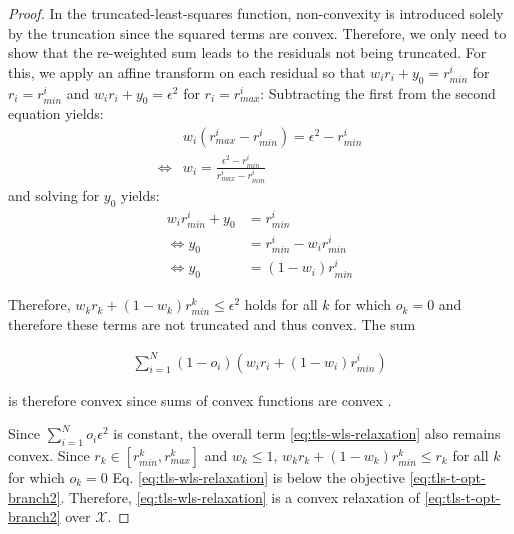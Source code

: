 \begin{proof}
	
	In the truncated-least-squares function, non-convexity is introduced solely by the truncation since the squared terms are convex.
	Therefore, we only need to show that the re-weighted sum leads to the residuals not being truncated. 
	For this, we apply an affine transform on each residual so that $w_i r_i + y_0 = r_{min}^i$ for $r_i = r_{min}^i$ and $w_i r_i + y_0 = \epsilon^2$ for $r_i = r_{max}^i$:
	Subtracting the first from the second equation yields:
	\begin{equation}
		\begin{aligned}	
			&w_i (r_{max}^i - r_{min}^i) = \epsilon^2 - r_{min}^i\\
			\iff &w_i  = \frac{\epsilon^2 - r_{min}^i}{r_{max}^i - r_{min}^i}
		\end{aligned}
	\end{equation}
	and solving for $y_0$ yields:
	\begin{equation}
		\begin{aligned}	
			w_i r_{min}^i + y_0 &= r_{min}^i\\
			\iff y_0 &= r_{min}^i - w_i r_{min}^i\\
			\iff y_0 &= (1- w_i) r_{min}^i
		\end{aligned}
	\end{equation}
	
	Therefore, $w_k r_k + (1 - w_k) r_{min}^k \leq \epsilon^2$ holds for all $k$ for which $o_k = 0$ and therefore these terms are not truncated and thus convex. The sum
	
	\begin{equation}
		\begin{aligned}	
			\sum_{i=1}^{N} (1 - o_i) \left(w_i r_i  + (1 - w_i) r_{min}^i \right)
		\end{aligned}
	\end{equation}
	
	is therefore convex since sums of convex functions are convex \cite[Ch. 2.3.2, p.36]{Boyd_Vandenberghe_2004}.
	
	Since $\sum_{i=1}^{N} o_i\epsilon^2$ is constant, the overall term \ref{eq:tls-wls-relaxation} also remains convex. Since $r_k \in [r^k_{min}, r^k_{max}]$ and $w_k \leq 1$, $w_k r_k  + (1 - w_k) r_{min}^k \leq r_k$ for all $k$ for which $o_k = 0$  Eq. \ref{eq:tls-wls-relaxation} is below the objective \ref{eq:tls-t-opt-branch2}. Therefore, \ref{eq:tls-wls-relaxation} is a convex relaxation of \ref{eq:tls-t-opt-branch2} over $\mathcal{X}$.
	
\end{proof}	

